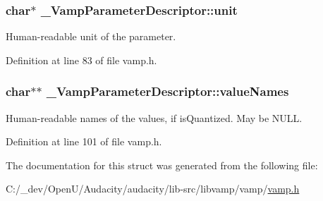 \subsubsection[{\texorpdfstring{unit}{unit}}]{ char$\ast$ \+\_\+\+Vamp\+Parameter\+Descriptor\+::unit}\hypertarget{struct___vamp_parameter_descriptor_a8ca235f816b56dc99125e010eee08fc7}{}\label{struct___vamp_parameter_descriptor_a8ca235f816b56dc99125e010eee08fc7}
Human-\/readable unit of the parameter. 

Definition at line 83 of file vamp.\+h.

\subsubsection[{\texorpdfstring{value\+Names}{valueNames}}]{ char$\ast$$\ast$ \+\_\+\+Vamp\+Parameter\+Descriptor\+::value\+Names}\hypertarget{struct___vamp_parameter_descriptor_a188883325ab1e4a898e3dc53a8f88f9d}{}\label{struct___vamp_parameter_descriptor_a188883325ab1e4a898e3dc53a8f88f9d}
Human-\/readable names of the values, if is\+Quantized. May be N\+U\+LL. 

Definition at line 101 of file vamp.\+h.



The documentation for this struct was generated from the following file\+:\begin{DoxyCompactItemize}
\item 
C\+:/\+\_\+dev/\+Open\+U/\+Audacity/audacity/lib-\/src/libvamp/vamp/\hyperlink{vamp_8h}{vamp.\+h}\end{DoxyCompactItemize}
